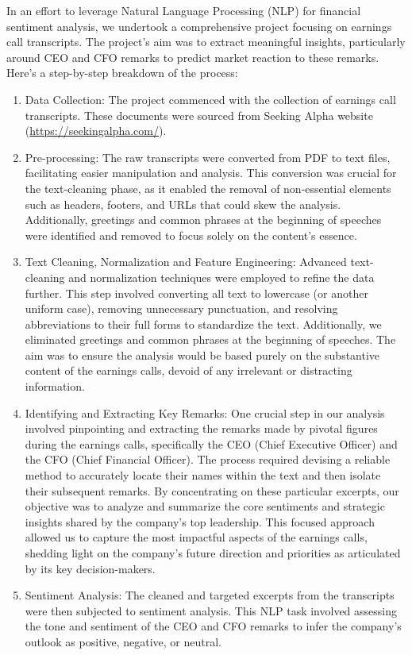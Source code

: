 \documentclass{article}
\begin{document}
In an effort to leverage Natural Language Processing (NLP) for financial sentiment analysis, we undertook a comprehensive project focusing on earnings call transcripts. The project's aim was to extract meaningful insights, particularly around CEO and CFO remarks to predict market reaction to these remarks. Here's a step-by-step breakdown of the process:
\begin{enumerate}
    \item Data Collection: The project commenced with the collection of earnings call transcripts. These documents were sourced from Seeking Alpha website (\hyperref[www]{https://seekingalpha.com/}).
  \item Pre-processing: The raw transcripts were converted from PDF to text files, facilitating easier manipulation and analysis. This conversion was crucial for the text-cleaning phase, as it enabled the removal of non-essential elements such as headers, footers, and URLs that could skew the analysis. Additionally, greetings and common phrases at the beginning of speeches were identified and removed to focus solely on the content's essence.
  \item Text Cleaning, Normalization and Feature Engineering: Advanced text-cleaning and normalization techniques were employed to refine the data further. This step involved converting all text to lowercase (or another uniform case), removing unnecessary punctuation, and resolving abbreviations to their full forms to standardize the text. Additionally, we eliminated greetings and common phrases at the beginning of speeches. The aim was to ensure the analysis would be based purely on the substantive content of the earnings calls, devoid of any irrelevant or distracting information.
  \item Identifying and Extracting Key Remarks: One crucial step in our analysis involved pinpointing and extracting the remarks made by pivotal figures during the earnings calls, specifically the CEO (Chief Executive Officer) and the CFO (Chief Financial Officer). The process required devising a reliable method to accurately locate their names within the text and then isolate their subsequent remarks. By concentrating on these particular excerpts, our objective was to analyze and summarize the core sentiments and strategic insights shared by the company's top leadership. This focused approach allowed us to capture the most impactful aspects of the earnings calls, shedding light on the company's future direction and priorities as articulated by its key decision-makers.
  \item Sentiment Analysis: The cleaned and targeted excerpts from the transcripts were then subjected to sentiment analysis. This NLP task involved assessing the tone and sentiment of the CEO and CFO remarks to infer the company's outlook as positive, negative, or neutral.

\end{enumerate}
\end{document}
